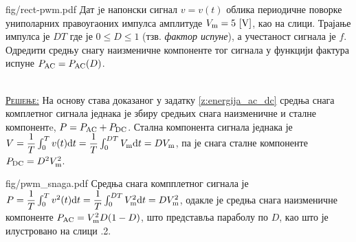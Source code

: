 \begin{slikaDesno}{fig/rect-pwm.pdf}
    \PID \label{z:snaga_pwm}
    Дат jе напонски сигнал $v = v(t)$ облика периодичне поворке униполарних правоугаоних 
    импулса амплитуде ${V_{\rm m} = 5\,\left[\mathrm{V}\right]}$, као на слици. Трајање импулса је $DT$ где је 
    $0 \leq D \leq 1$ (тзв. \textit{фактор испуне}), а учестаност сигнала је $f$. Одредити средњу снагу 
    наизменичне компоненте тог сигнала у функцији фактура испуне $P_{\rm AC} = P_{\rm AC}(D)$. 
\end{slikaDesno}
\\[2mm]

\textsc{\underline{Решење:}}
На основу става доказаног у задатку \ref{z:energija_ac_dc} средња снага комплетног сигнала
једнака је збиру средњих снага наизменичне и сталне компонентe, $P = P_{\rm AC} + P_{\rm DC}$. 
Стална компонента сигнала једнака је 
$V = \dfrac{1}{T} \int_0^T v(t) {\rm d} t = \dfrac{1}{T} \int_0^{DT} V_{\rm m} {\rm d} t = DV_{\rm m}$, па је 
снага сталне компоненте $P_{\rm DC} = D^2 V_{\rm m}^2$. 

\begin{slikaDesno}{fig/pwm_snaga.pdf}
    Средња снага компплетног сигнала је 
    $P = \dfrac{1}{T} \int_0^T v^2(t) {\rm d} t = \dfrac{1}{T} \int_0^{DT} V_{\rm m}^2 {\rm d} t = DV_{\rm m}^2$,
    одакле је средња снага наизменичне компоненте   
    $P_{\rm AC} = V_{\rm m}^2 D(1 - D)$, што представља параболу по $D$, као што је илустровано на слици \ID.2.
\end{slikaDesno}

